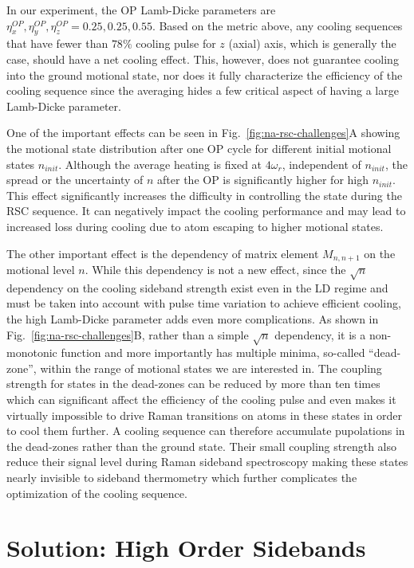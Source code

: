 In our experiment, the OP Lamb-Dicke parameters are
$\eta^{OP}_x, \eta^{OP}_y, \eta^{OP}_z = 0.25, 0.25, 0.55$.
Based on the metric above, any cooling sequences
that have fewer than $78\%$ cooling pulse for $z$ (axial) axis, which is generally the case,
should have a net cooling effect.
This, however, does not guarantee cooling into the ground motional state,
nor does it fully characterize the efficiency of the cooling sequence
since the averaging hides a few critical aspect of having a large Lamb-Dicke parameter.

One of the important effects can be seen in Fig.~\ref{fig:na-rsc-challenges}A showing
the motional state distribution after one OP cycle
for different initial motional states $n_{init}$.
Although the average heating is fixed at $4\omega_r$, independent of $n_{init}$,
the spread or the uncertainty of $n$ after the OP is significantly higher for high $n_{init}$.
This effect significantly increases the difficulty in controlling the state during the
RSC sequence. It can negatively impact the cooling performance and
may lead to increased loss during cooling due to atom escaping to higher motional states.

The other important effect is the dependency of matrix element $M_{n,n+1}$
on the motional level $n$.
While this dependency is not a new effect, since the $\sqrt{n}$ dependency
on the cooling sideband strength exist even in the LD regime
and must be taken into account with pulse time variation\todo{\cite{}}
to achieve efficient cooling, the high Lamb-Dicke parameter adds even more complications.
As shown in Fig.~\ref{fig:na-rsc-challenges}B, rather than a simple $\sqrt{n}$ dependency,
it is a non-monotonic function and more importantly has multiple minima, so-called ``dead-zone'',
within the range of motional states we are interested in.
The coupling strength for states in the dead-zones can be reduced by more than ten times
which can significant affect the efficiency of the cooling pulse
and even makes it virtually impossible to drive Raman transitions on atoms in these states
in order to cool them further.
A cooling sequence can therefore accumulate pupolations in the dead-zones
rather than the ground state.
Their small coupling strength also reduce their signal level during
Raman sideband spectroscopy making these states nearly invisible to sideband thermometry
which further complicates the optimization of the cooling sequence.

\section{Solution: High Order Sidebands}
\label{ch:rsc-solution-high-orders}

